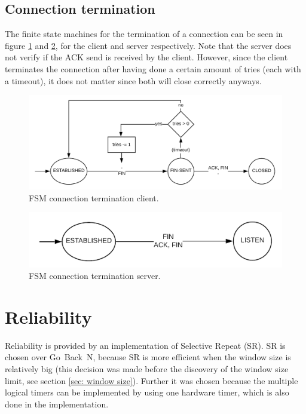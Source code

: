 \documentclass[a4paper]{article}
\begin{document}
	\subsection{Connection termination}
	The finite state machines for the termination of a connection can be seen in figure \ref{fig: phase 3 client} and \ref{fig: phase 3 server}, for the client and server respectively. Note that the server does not verify if the ACK send is received by the client. However, since the client terminates the connection after having done a certain amount of tries (each with a timeout), it does not matter since both will close correctly anyways.
	\begin{figure}[h]
		\centering
		\includegraphics[width = \textwidth]{phase3_client.png}
		\caption{FSM connection termination client.}
		\label{fig: phase 3 client}
	\end{figure}
	\begin{figure}[h]
		\centering
		\includegraphics[width = .7\textwidth]{phase3_server.png}
		\caption{FSM connection termination server.}
		\label{fig: phase 3 server}
	\end{figure}

\section{Reliability}
Reliability is provided by an implementation of Selective Repeat (SR). SR is chosen over Go~Back~N, because SR is more efficient when the window size is relatively big (this decision was made before the discovery of the window size limit, see section \ref{sec: window size}). Further it was chosen because the multiple logical timers can be implemented by using one hardware timer, which is also done in the implementation.
\end{document}
